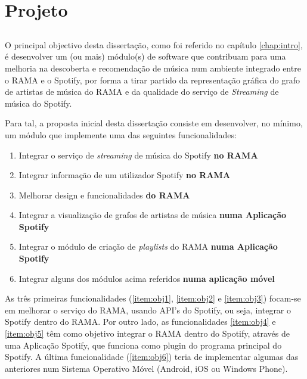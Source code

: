 
\chapter{Projeto}
\label{chap:chap3}

\section*{}

O principal objectivo desta dissertação, como foi referido no capítulo \ref{chap:intro}, é desenvolver um (ou mais) módulo(s) de software que contribuam para uma melhoria na descoberta e recomendação de música num ambiente integrado entre o RAMA e o Spotify, por forma a tirar partido da representação gráfica do grafo de artistas de música do RAMA e da qualidade do serviço de \emph{Streaming} de música do Spotify.

Para tal, a proposta inicial desta dissertação consiste em desenvolver, no mínimo, um módulo que implemente uma das seguintes funcionalidades:

\begin{enumerate}
  \item \label{item:obj1} Integrar o serviço de \emph{streaming} de música do Spotify \textbf{no RAMA}
  \item \label{item:obj2} Integrar informação de um utilizador Spotify \textbf{no RAMA}
  \item \label{item:obj3} Melhorar design e funcionalidades \textbf{do RAMA}
  \item \label{item:obj4} Integrar a visualização de grafos de artistas de música \textbf{numa Aplicação Spotify}
  \item \label{item:obj5} Integrar o módulo de criação de \emph{playlists} do RAMA \textbf{numa Aplicação Spotify}
  \item \label{item:obj6} Integrar alguns dos módulos acima referidos \textbf{numa aplicação móvel}
\end{enumerate}

As três primeiras funcionalidades (\ref{item:obj1}, \ref{item:obj2} e \ref{item:obj3}) focam-se em melhorar o serviço do RAMA, usando API's do Spotify, ou seja, integrar o Spotify dentro do RAMA.
Por outro lado, as funcionalidades \ref{item:obj4} e \ref{item:obj5} têm como objetivo integrar o RAMA dentro do Spotify, através de uma Aplicação Spotify, que funciona como plugin do programa principal do Spotify.
A última funcionalidade (\ref{item:obj6}) teria de implementar algumas das anteriores num Sistema Operativo Móvel (Android, iOS ou Windows Phone).

